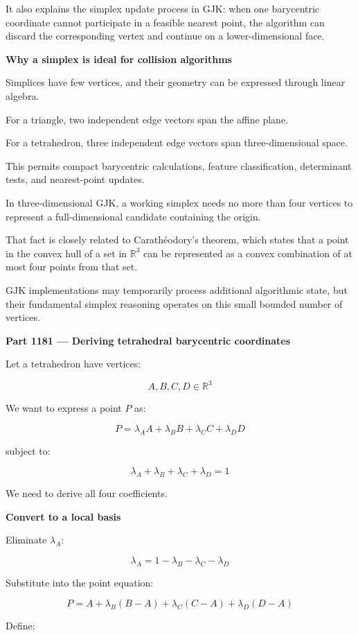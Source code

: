 It also explains the simplex update process in GJK: when one barycentric coordinate cannot participate in a feasible nearest point, the algorithm can discard the corresponding vertex and continue on a lower-dimensional face.

\textbf{Why a simplex is ideal for collision algorithms}

Simplices have few vertices, and their geometry can be expressed through linear algebra.

For a triangle, two independent edge vectors span the affine plane.

For a tetrahedron, three independent edge vectors span three-dimensional space.

This permits compact barycentric calculations, feature classification, determinant tests, and nearest-point updates.

In three-dimensional GJK, a working simplex needs no more than four vertices to represent a full-dimensional candidate containing the origin.

That fact is closely related to Carathéodory's theorem, which states that a point in the convex hull of a set in \(\mathbb R^3\) can be represented as a convex combination of at most four points from that set.

GJK implementations may temporarily process additional algorithmic state, but their fundamental simplex reasoning operates on this small bounded number of vertices.

\textbf{Part 1181 --- Deriving tetrahedral barycentric coordinates}

Let a tetrahedron have vertices:

\[
A,B,C,D\in\mathbb R^3
\]

We want to express a point \(P\) as:

\[
\boxed{ P=\lambda_AA+\lambda_BB+\lambda_CC+\lambda_DD }
\]

subject to:

\[
\lambda_A+\lambda_B+\lambda_C+\lambda_D=1
\]

We need to derive all four coefficients.

\textbf{Convert to a local basis}

Eliminate \(\lambda_A\):

\[
\lambda_A=1-\lambda_B-\lambda_C-\lambda_D
\]

Substitute into the point equation:

\[
P=A+\lambda_B(B-A)+\lambda_C(C-A)+\lambda_D(D-A)
\]

Define:

